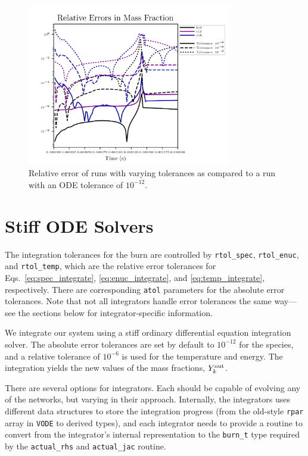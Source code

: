 \begin{figure}
	\centering
	\includegraphics[width=3.5in]{tolerances.png}
	\caption{Relative error of runs with varying tolerances as compared
	         to a run with an ODE tolerance of $10^{-12}$.}
	\label{fig:tolerances}
\end{figure}



\section{Stiff ODE Solvers}
\label{ch:networks:integrators}

The integration tolerances for the burn are controlled by
\texttt{rtol\_spec}, \texttt{rtol\_enuc}, and \texttt{rtol\_temp},
which are the relative error tolerances for
Eqs.~\ref{eq:spec_integrate}, \ref{eq:enuc_integrate}, and
\ref{eq:temp_integrate}, respectively. There are corresponding
\texttt{atol} parameters for the absolute error tolerances. Note that
not all integrators handle error tolerances the same way---see the
sections below for integrator-specific information.

We integrate our system using a stiff ordinary differential equation
integration solver. The absolute error tolerances are set by default
to $10^{-12}$ for the species, and a relative tolerance of $10^{-6}$
is used for the temperature and energy.  The integration yields the
new values of the mass fractions, $Y_k^{\rm out}$.

There are several options for integrators.  Each should be capable of
evolving any of the networks, but varying in their approach.  Internally,
the integrators uses different data structures to store the integration
progress (from the old-style {\tt rpar} array in {\tt VODE} to derived
types), and each integrator needs to provide a routine to convert
from the integrator's internal representation to the {\tt burn\_t}
type required by the {\tt actual\_rhs} and {\tt actual\_jac} routine.

